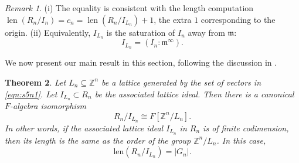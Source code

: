 \documentclass[11pt]{amsart}
\newcommand{\Z}{\mathbb{Z}}
\theoremstyle{plain}
\newtheorem{theorem}{Theorem}[section]
\theoremstyle{definition}
\theoremstyle{remark}
\newtheorem{remark}[theorem]{Remark}
\begin{document}
\begin{remark}
	(i) The equality is consistent with the length computation 
\(\operatorname{len}(R_n/I_n) = c_n = \operatorname{len}(R_n/I_{L_n}) + 1\), 
the extra \(1\) corresponding to the origin. 
(ii) Equivalently, \( I_{L_n} \) is the saturation of \( I_n \) away from \(  \mathfrak{m} \):
\[
I_{L_n} = (I_n :  \mathfrak{m}^{\infty}).
\]
\end{remark}


We now present our main result in this section, following the discussion in \citep[Sect.~7.1, Theorems~7.3-7.4]{Miller-Sturmfels2005}.

\begin{theorem}\label{thm:lattice-algebras}
	Let \( L_n \subseteq \Z^n \) be a lattice generated by the set of vectors in \eqref{eqn:s5n1}.  Let \( I_{L_n} \subset R_n \) be the associated lattice ideal. Then there is a canonical \( F \)-algebra isomorphism
	\[
	R_n / I_{L_n} \cong F[\mathbb{Z}^n / L_n].
	\] In other words, if the associated lattice ideal \( I_{L_n} \) in \( R_n \)  is of finite codimension, then its length is the same as the order of the group \( \Z^n / L_n \). In this case, \[ \text{len} (R_n/I_{L_n}) = | G_n |. \]
\end{theorem}
\end{document}
